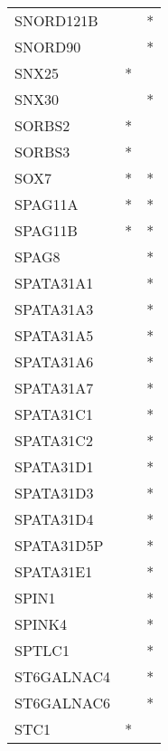 \begin{longtable}{lcc}
SNORD121B             &                &          * \\
SNORD90               &                &          * \\
SNX25                 &              * &            \\
SNX30                 &                &          * \\
SORBS2                &              * &            \\
SORBS3                &              * &            \\
SOX7                  &              * &          * \\
SPAG11A               &              * &          * \\
SPAG11B               &              * &          * \\
SPAG8                 &                &          * \\
SPATA31A1             &                &          * \\
SPATA31A3             &                &          * \\
SPATA31A5             &                &          * \\
SPATA31A6             &                &          * \\
SPATA31A7             &                &          * \\
SPATA31C1             &                &          * \\
SPATA31C2             &                &          * \\
SPATA31D1             &                &          * \\
SPATA31D3             &                &          * \\
SPATA31D4             &                &          * \\
SPATA31D5P            &                &          * \\
SPATA31E1             &                &          * \\
SPIN1                 &                &          * \\
SPINK4                &                &          * \\
SPTLC1                &                &          * \\
ST6GALNAC4            &                &          * \\
ST6GALNAC6            &                &          * \\
STC1                  &              * &            \\

\end{longtable}
